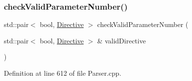 \subsubsection{\texorpdfstring{check\+Valid\+Parameter\+Number()}{checkValidParameterNumber()}}
{\footnotesize\ttfamily std\+::pair$<$ bool, \hyperlink{classft_1_1_directive}{Directive} $>$ check\+Valid\+Parameter\+Number (\begin{DoxyParamCaption}\item[{std\+::pair$<$ bool, \hyperlink{classft_1_1_directive}{Directive} $>$ \&}]{valid\+Directive }\end{DoxyParamCaption})\hspace{0.3cm}{\ttfamily [private]}}



Definition at line 612 of file Parser.\+cpp.



